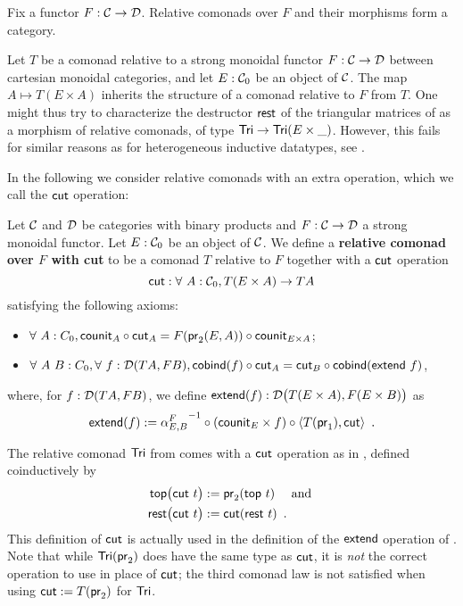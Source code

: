 \documentclass{amsart}
\newcommand{\fat}[1]{\textbf{#1}}
\begin{document}
\begin{remark}
 Fix a functor $F : \C\to\D$. Relative comonads over $F$ and their morphisms form a category.
\end{remark}

\begin{remark}
  Let $T$ be a comonad relative to a strong monoidal functor $F:\C\to\D$ between cartesian monoidal categories,
  and let $E:\C_0$ be an object of $\C$.
 The map $A\mapsto T(E\times A)$ inherits the structure of a comonad relative to $F$ from $T$.
 One might thus try to characterize the destructor $\tail$ of the triangular matrices of 
 as a morphism of relative comonads, of type $\Tri \to \Tri(E\times \_)$.
 However, this fails for similar reasons as for heterogeneous inductive datatypes, see \parencite[Ex.\ 3.18]{ahrens_zsido}.
\end{remark}

In the following we consider relative comonads with an extra operation, which we call the $\cut$ operation:

\begin{definition}\label{def:rel_comonad_with_cut}
 Let $\C$ and $\D$ be categories with binary products and $F:\C\to\D$ a strong monoidal functor. Let $E:\C_0$ be an object of $\C$.
 We define a \fat{relative comonad over $F$ with cut} to be a comonad $T$ relative to $F$ together with a $\cut$ operation 
    \[ \cut : \forall~A:\C_0, T(E\times A) \to TA \]
 satisfying the following axioms:
  \begin{itemize}
   \item $\forall~A:C_0, \comp{\cut_A}{\counit_A} = \comp{\counit_{E\times A}}{F(\pr_2(E,A))}$;
   \item $\forall~A~B:C_0,\forall~f:\D(TA,FB), \comp{\cut_A}{\cobind(f)} = \comp{\cobind(\extend~f)}{\cut_B}$,
  \end{itemize}

  \noindent
  where, for $f:\D(TA,FB)$, we define $\extend(f) : \D\bigl(T(E\times A),F(E\times B)\bigr)$ as
       \[ \extend(f) := \comp{\comp{\langle T(\pr_1) , \cut \rangle}{(\counit_E\times f)}}{{\alpha^{F}_{E,B}}^{-1}} \enspace . \]
  
\end{definition}

\begin{example}
  The relative comonad $\Tri$ from  comes with a $\cut$ operation as in ,
  defined coinductively by
   \begin{align*}\head\bigl(\cut~t\bigr) &:= \pr_2(\head~t) \quad\text{ and } \\
                     \tail\bigl(\cut~t\bigr) &:= \cut(\tail~t) \enspace . 
      \end{align*}
  This definition of $\cut$ is actually used in the definition of the $\extend$ operation of .
  Note that while $\Tri(\pr_2)$ does have the same type as $\cut$, it is \emph{not} the correct operation to use in place of $\cut$;
  the third comonad law is not satisfied when using $\cut:=T(\pr_2)$ for $\Tri$.
\end{example}
\end{document}
